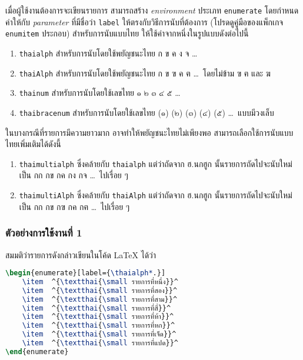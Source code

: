 \documentclass[10pt]{ltxguide}
\begin{document}
เมื่อผู้ใช้งานต้องการจะเขียนรายการ สามารถสร้าง \emph{environment} ประเภท \textlatin{\texttt{enumerate}} โดยกำหนดค่าให้กับ \emph{parameter} ที่มีชื่อว่า \textlatin{\texttt{label}} ให้ตรงกับวิธีการนับที่ต้องการ (โปรดดูคู่มือของแพ็กเกจ \textlatin{\texttt{enumitem}} ประกอบ) สำหรับการนับแบบไทย ให้ใช้ค่าจากหนึ่งในรูปแบบดังต่อไปนี้

\begin{enumerate}[topsep=0pc,itemsep=-0.25pc,label={\thainum*.}]
    \item  \textlatin{\texttt{thaialph}} สำหรับการนับโดยใช้พยัญชนะไทย ก ข ค ง จ \ldots
    \item  \textlatin{\texttt{thaiAlph}} สำหรับการนับโดยใช้พยัญชนะไทย ก ข ฃ ค ฅ \ldots\, โดยไม่ข้าม ฃ ฅ และ ฆ
    \item  \textlatin{\texttt{thainum}} สำหรับการนับโดยใช้เลขไทย ๑ ๒ ๓ ๔ ๕ \ldots
    \item  \textlatin{\texttt{thaibracenum}} สำหรับการนับโดยใช้เลขไทย (๑) (๒) (๓) (๔) (๕) \ldots\, แบบมีวงเล็บ
\end{enumerate}

\bigskip
ในบางกรณีที่รายการมีความยาวมาก อาจทำให้พยัญชนะไทยไม่เพียงพอ สามารถเลือกใช้การนับแบบไทยเพิ่มเติมได้ดังนี้

\begin{enumerate}[topsep=0pc,itemsep=-0.25pc,label={\thainum*.},start=5]
    \item  \textlatin{\texttt{thaimultialph}} ซึ่งคล้ายกับ \textlatin{\texttt{thaialph}} แต่ว่าถัดจาก ฮ.นกฮูก นั้นรายการถัดไปจะนับใหม่เป็น กก กข กค กง กจ \ldots\, ไปเรื่อย ๆ
    \item  \textlatin{\texttt{thaimultiAlph}} ซึ่งคล้ายกับ \textlatin{\texttt{thaiAlph}} แต่ว่าถัดจาก ฮ.นกฮูก นั้นรายการถัดไปจะนับใหม่เป็น กก กข กฃ กค กฅ \ldots\, ไปเรื่อย ๆ
\end{enumerate}

\subsubsection*{ตัวอย่างการใช้งานที่ 1}
สมมติว่ารายการดังกล่าวเขียนในโค้ด \textrm{\LaTeX} ได้ว่า
\begin{latintext}
\begin{lstlisting}[language=LaTeX,numbers=none,escapechar={\^},basicstyle=\linespread{1.5}\ttfamily,lineskip={6pt}]
\begin{enumerate}[label={\thaialph*.}]
    \item  ^{\textthai{\small รายการที่หนึ่ง}}^
    \item  ^{\textthai{\small รายการที่สอง}}^
    \item  ^{\textthai{\small รายการที่สาม}}^
    \item  ^{\textthai{\small รายการที่สี่}}^
    \item  ^{\textthai{\small รายการที่ห้า}}^
    \item  ^{\textthai{\small รายการที่หก}}^
    \item  ^{\textthai{\small รายการที่เจ็ด}}^
    \item  ^{\textthai{\small รายการที่แปด}}^
\end{enumerate}
\end{lstlisting}
\end{latintext}
\end{document}
